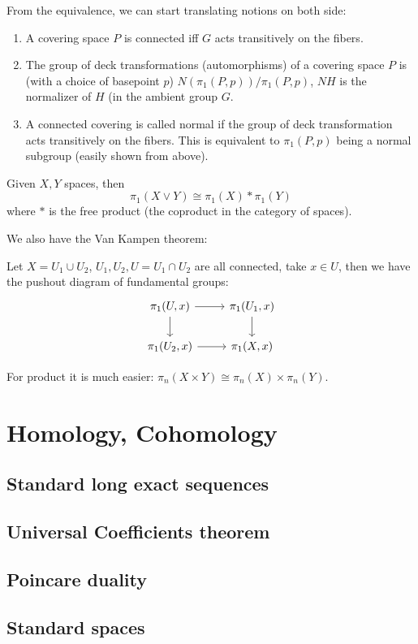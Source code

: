 \documentclass[main.tex]{subfiles}
\begin{document}
\begin{remark}
From the equivalence, we can start translating notions on both side:

\begin{enumerate}
    \item A covering space $P$ is connected iff $G$ acts transitively on the fibers.
    \item The group of deck transformations (automorphisms) of a covering space $P$ is (with a choice of basepoint $p$) $N(\pi_1(P,p))/\pi_1(P,p)$, $NH$ is the normalizer of $H$ (in the ambient group $G$.
    \item A connected covering is called normal if the group of deck transformation acts transitively on the fibers. This is equivalent to $\pi_1(P,p)$ being a normal subgroup (easily shown from above).
\end{enumerate}
\end{remark}

Given $X, Y$ spaces, then 
$$
\pi_1(X \vee Y) \cong \pi_1(X) * \pi_1(Y)
$$
where $*$ is the free product (the coproduct in the category of spaces).

We also have the Van Kampen theorem:
\begin{theorem}
Let $X = U_1 \cup U_2$, $U_1, U_2, U = U_1 \cap U_2$ are all connected, take $x \in U$, then we have the pushout diagram of fundamental groups:
\begin{equation}
    \begin{tikzcd}
\pi_1 (U, x) \arrow[r] \arrow[d]
& \pi_1 (U_1, x) \arrow[d] \\
\pi_1(U_2, x) \arrow[r]
& \pi_1(X,x)
\end{tikzcd}
\end{equation}
\end{theorem}

For product it is much easier:
$\pi_n(X \times Y) \cong \pi_n(X) \times \pi_n(Y)$.

\section{Homology, Cohomology}
\subsection{Standard long exact sequences}

\subsection{Universal Coefficients theorem}


\subsection{Poincare duality}


\subsection{Standard spaces}
\end{document}
